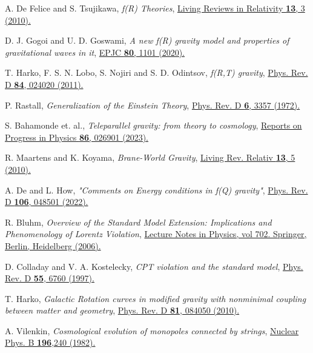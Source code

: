 \documentclass[aps,amsmath,amssymb,showpacs,showkeys]{revtex4}
\begin{document}
\begin{thebibliography}{99}
A. De Felice and S. Tsujikawa, \textit{f(R) Theories}, \href{https://doi.org/10.12942/lrr-2010-3}{Living Reviews in Relativity \textbf{13}, 3 (2010).}

D. J. Gogoi and U. D. Goswami, \textit{A new f(R) gravity model and properties of gravitational waves in it}, \href{https://link.springer.com/article/10.1140/epjc/s10052-020-08684-3}{EPJC \textbf{80}, 1101 (2020).}

T. Harko, F. S. N. Lobo, S. Nojiri and S. D. Odintsov, \textit{f(R,T) gravity}, \href{https://journals.aps.org/prd/abstract/10.1103/PhysRevD.84.024020}{Phys. Rev. D \textbf{84}, 024020 (2011).}

P. Rastall, \textit{Generalization of the Einstein Theory}, \href{https://doi.org/10.1103/PhysRevD.6.3357}{Phys. Rev. D \textbf{6}, 3357 (1972).}

S. Bahamonde et. al., \textit{Teleparallel gravity: from theory to cosmology}, \href{https://iopscience.iop.org/article/10.1088/1361-6633/ac9cef}{Reports on Progress in Physics \textbf{86}, 026901 (2023).}

R. Maartens and K. Koyama, \textit{Brane-World Gravity}, \href{https://doi.org/10.12942/lrr-2010-5}{Living Rev. Relativ \textbf{13}, 5 (2010).}

A. De and L. How, \textit{"Comments on Energy conditions in f(Q) gravity"}, \href{https://journals.aps.org/prd/abstract/10.1103/PhysRevD.106.048501}{Phys. Rev. D \textbf{106}, 048501 (2022).}

R. Bluhm, \textit{Overview of the Standard Model Extension: Implications and Phenomenology of Lorentz Violation}, \href{https://doi.org/10.1007/3-540-34523-X_8}{Lecture Notes in Physics, vol 702. Springer, Berlin, Heidelberg (2006).}

D. Colladay and V. A. Kostelecky, \textit{CPT violation and the standard model}, \href{https://journals.aps.org/prd/abstract/10.1103/PhysRevD.55.6760}{Phys. Rev. D \textbf{55}, 6760 (1997).}

T. Harko, \textit{Galactic Rotation curves in modified gravity with nonminimal coupling between matter and geometry}, \href{https://journals.aps.orghttps://www.overleaf.com/project/63be5ba2b69dd816c349f45f/detacher/prd/abstract/10.1103/PhysRevD.81.084050}{Phys. Rev. D \textbf{81}, 084050 (2010).}

A. Vilenkin, \textit{Cosmological evolution of monopoles connected by strings}, \href{https://doi.org/10.1016/0550-3213(82)90037-2}{Nuclear Phys. B \textbf{196},240 (1982).}



\end{thebibliography}
\end{document}
